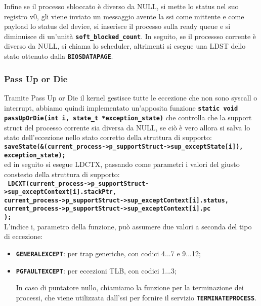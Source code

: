 \documentclass{article}
\begin{document}
	Infine se il processo sbloccato è diverso da NULL, si mette lo status nel suo
	registro v0, gli viene inviato un messaggio avente la ssi come mittente e come
	payload lo status del device, si inserisce il processo sulla ready queue e si
	diminuisce di un'unità \texttt{\textbf{soft\_blocked\_count}}. In seguito, se il
	processso corrente è diverso da NULL, si chiama lo scheduler, altrimenti si esegue
	una LDST dello stato ottenuto dalla \texttt{\textbf{BIOSDATAPAGE}}.
	\subsubsection{Pass Up or Die}
	Tramite Pass Up or Die il kernel gestisce tutte le eccezione che non sono syscall
	o interrupt, abbiamo quindi implementato un'apposita funzione \texttt{\textbf{static
	void passUpOrDie(int i, state\_t *exception\_state)}} che controlla che la support
	struct del processo corrente sia diversa da NULL, se ciò è vero allora si
	salva lo stato dell'eccezione nello stato corretto della struttura di supporto:
	\\ \texttt{\textbf{saveState(\&(current\_process->p\_supportStruct->sup\_exceptState[i]),
	exception\_state);}} \\ ed in seguito si esegue LDCTX, passando come parametri
	i valori del giusto constesto della struttura di supporto: \\ \texttt{\textbf{
	LDCXT(current\_process->p\_supportStruct->sup\_exceptContext[i].stackPtr, \\ current\_process->p\_supportStruct->sup\_exceptContext[i].status,
	\\ current\_process->p\_supportStruct->sup\_exceptContext[i].pc \\ ); }} \\ L'indice
	i, parametro della funzione, può assumere due valori a seconda del tipo di eccezione:
	\begin{itemize}
		\item \texttt{\textbf{GENERALEXCEPT}}: per trap generiche, con codici 4...7
			e 9...12;

		\item \texttt{\textbf{PGFAULTEXCEPT}}: per eccezioni TLB, con codici 1...3;

			In caso di puntatore nullo, chiamiamo la funzione per la terminazione dei processi,
			che viene utilizzata dall'ssi per fornire il servizio \texttt{\textbf{TERMINATEPROCESS}}.
	\end{itemize}
	\newpage
\end{document}
